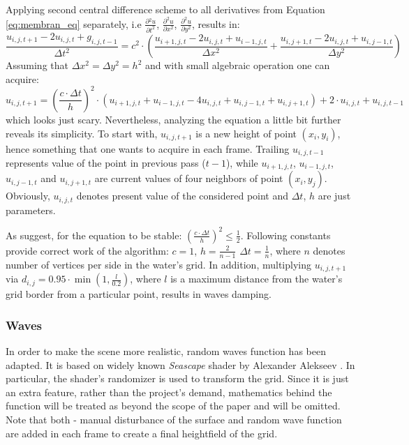 \documentclass{report}
\begin{document}
Applying second central difference scheme to all derivatives from Equation \ref{eq:membran_eq} separately, i.e $\frac {\partial{^2u}}{\partial t^2}$, $\frac{\partial^2u}{\partial x^2}$, $\frac{\partial^2u}{\partial y^2}$, results in:
\begin{equation*}
\frac{u_{i , j, t+1} - 2 u_{i , j, t} + g_{i , j, t-1}}{\Delta t ^ 2} = c^2 \cdot (\frac{u_{i+1 , j, t} - 2 u_{i , j, t} + u_{i-1 , j, t}}{\Delta x ^ 2} + \frac{u_{i , j+1, t} - 2 u_{i , j, t} + u_{i , j-1, t}}{\Delta y ^ 2})
\end{equation*}
Assuming that $\Delta x^2 = \Delta y^2 = h^2$ and with small algebraic operation one can acquire:
\begin{equation} \label{eq:shallow_water_basic}
u_{i , j, t+1} = (\frac{c \cdot \Delta t}{h})^{2} \cdot (u_{i+1 , j, t} + u_{i-1 , j, t} - 4 u_{i , j, t} + u_{i , j-1, t} + u_{i , j+1, t}) +2 \cdot u_{i,j,t} + u_{i,j,t-1}
\end{equation}
which looks just scary. Nevertheless, analyzing the equation a little bit further reveals its simplicity. To start with, $u_{i , j, t+1}$ is a new height of point $(x_i, y_i)$, hence something that one wants to acquire in each frame. Trailing $u_{i,j,t-1}$ represents value of the point in previous pass ($t-1$), while $u_{i+1 , j, t}$, $u_{i-1 , j, t}$, $u_{i , j-1, t}$ and $ u_{i , j+1, t}$ 
are current values of four neighbors of point $(x_i, y_j)$. Obviously, $u_{i , j, t}$ denotes present value of the considered point and $\Delta t$, $h$ are just parameters.

As \cite{gomez} suggest, for the equation to be stable: $(\frac{c \cdot \Delta t}{h})^{2} \leq \frac{1}{2}$. Following constants provide correct work of the algorithm: $c = 1$, $h = \frac{2}{n-1}$ $\Delta t = \frac{1}{n}$, where $n$ denotes number of vertices per side in the water's grid. In addition, multiplying $u_{i , j, t+1}$ via $d_{i,j} = 0.95 \cdot \min(1,\frac{l}{0.2})$, where $l$ is a maximum distance from the water's grid border from a particular point, results in waves damping.

\subsubsection{Waves}
In order to make the scene more realistic, random waves function has been adapted. It is based on widely known \textit{Seascape} shader by Alexander Alekseev \cite{shader_seascape}. In particular, the shader's randomizer is used to transform the grid. Since it is just an extra feature, rather than the project's demand, mathematics behind the function will be treated as beyond the scope of the paper and will be omitted. Note that both - manual disturbance of the surface and random wave function are added in each frame to create a final heightfield of the grid.
\end{document}
